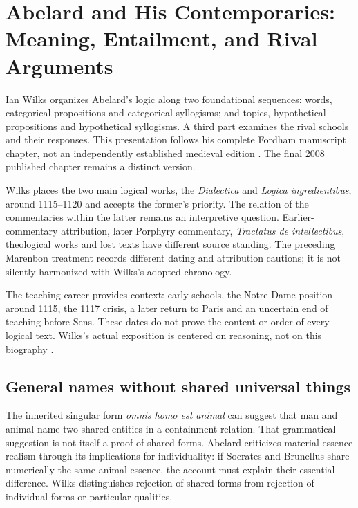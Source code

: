 \chapter{Abelard and His Contemporaries: Meaning, Entailment, and Rival Arguments}
\label{sec:p13-abelard-and-contemporaries}

Ian Wilks organizes Abelard's logic along two foundational sequences:
words, categorical propositions and categorical syllogisms; and topics,
hypothetical propositions and hypothetical syllogisms. A third part examines
the rival schools and their responses. This presentation follows his complete
Fordham manuscript chapter, not an independently established medieval edition
\cite[pp.~83--156]{Wilks2007FordhamAbelard}.
The final 2008 published chapter remains a distinct version.

Wilks places the two main logical works, the \emph{Dialectica} and
\emph{Logica ingredientibus}, around 1115--1120 and accepts the former's
priority. The relation of the commentaries within the latter remains
an interpretive question. Earlier-commentary attribution, later Porphyry
commentary, \emph{Tractatus de intellectibus}, theological works and
lost texts have different source standing. The preceding Marenbon
treatment records different dating and attribution cautions; it is not
silently harmonized with Wilks's adopted chronology.

The teaching career provides context: early schools, the Notre Dame
position around 1115, the 1117 crisis, a later return to Paris and
an uncertain end of teaching before Sens. These dates do not prove
the content or order of every logical text. Wilks's actual exposition
is centered on reasoning, not on this biography
\cite[pp.~83--85]{Wilks2007FordhamAbelard}.

\section{General names without shared universal things}
\label{sec:p13-abelard-names}

The inherited singular form \emph{omnis homo est animal} can suggest
that man and animal name two shared entities in a containment relation.
That grammatical suggestion is not itself a proof of shared forms.
Abelard criticizes material-essence realism through its implications
for individuality: if Socrates and Brunellus share numerically the
same animal essence, the account must explain their essential difference.
Wilks distinguishes rejection of shared forms from rejection of
individual forms or particular qualities.

